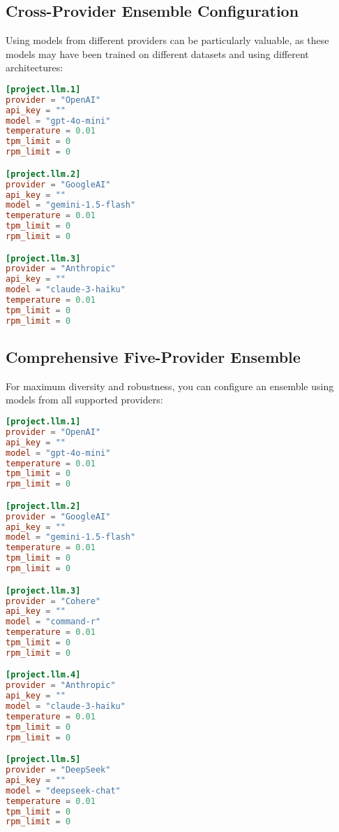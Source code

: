 \subsection{Cross-Provider Ensemble Configuration}

Using models from different providers can be particularly valuable, as these models may have been trained on different datasets and using different architectures:

\begin{configbox}
\begin{lstlisting}[language=TOML]
[project.llm.1]
provider = "OpenAI"
api_key = ""
model = "gpt-4o-mini"
temperature = 0.01
tpm_limit = 0
rpm_limit = 0

[project.llm.2]
provider = "GoogleAI"
api_key = ""
model = "gemini-1.5-flash"
temperature = 0.01
tpm_limit = 0
rpm_limit = 0

[project.llm.3]
provider = "Anthropic"
api_key = ""
model = "claude-3-haiku"
temperature = 0.01
tpm_limit = 0
rpm_limit = 0
\end{lstlisting}
\end{configbox}

\subsection{Comprehensive Five-Provider Ensemble}

For maximum diversity and robustness, you can configure an ensemble using models from all supported providers:


\begin{configbox}
\begin{lstlisting}[language=TOML]
[project.llm.1]
provider = "OpenAI"
api_key = ""
model = "gpt-4o-mini"
temperature = 0.01
tpm_limit = 0
rpm_limit = 0

[project.llm.2]
provider = "GoogleAI"
api_key = ""
model = "gemini-1.5-flash"
temperature = 0.01
tpm_limit = 0
rpm_limit = 0

[project.llm.3]
provider = "Cohere"
api_key = ""
model = "command-r"
temperature = 0.01
tpm_limit = 0
rpm_limit = 0

[project.llm.4]
provider = "Anthropic"
api_key = ""
model = "claude-3-haiku"
temperature = 0.01
tpm_limit = 0
rpm_limit = 0

[project.llm.5]
provider = "DeepSeek"
api_key = ""
model = "deepseek-chat"
temperature = 0.01
tpm_limit = 0
rpm_limit = 0
\end{lstlisting}
\end{configbox}


